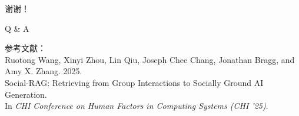 \documentclass[UTF8,aspectratio=169]{ctexbeamer}
\begin{document}
\begin{frame}
\begin{center}
{\Huge 谢谢！}

\vspace{1cm}

{\Large Q \& A}

\vspace{1cm}

\small
参考文献：\\
Ruotong Wang, Xinyi Zhou, Lin Qiu, Joseph Chee Chang, Jonathan Bragg, and Amy X. Zhang. 2025. \\
Social-RAG: Retrieving from Group Interactions to Socially Ground AI Generation. \\
In \textit{CHI Conference on Human Factors in Computing Systems (CHI '25)}.
\end{center}
\end{frame}
\end{document}
